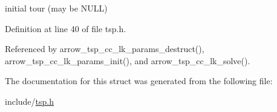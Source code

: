 initial tour (may be NULL) 

Definition at line 40 of file tsp.h.

Referenced by arrow\_\-tsp\_\-cc\_\-lk\_\-params\_\-destruct(), arrow\_\-tsp\_\-cc\_\-lk\_\-params\_\-init(), and arrow\_\-tsp\_\-cc\_\-lk\_\-solve().

The documentation for this struct was generated from the following file:\begin{CompactItemize}
\item 
include/\hyperlink{tsp_8h}{tsp.h}\end{CompactItemize}
